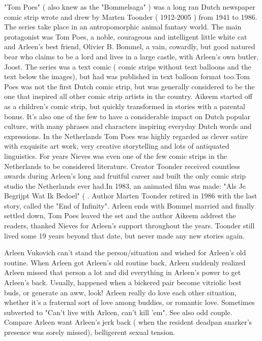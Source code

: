 \documentclass[12pt]{book}
\begin{document}
"Tom Poes" ( also knew as the "Bommelsaga" ) was a long ran Dutch newspaper comic strip wrote and drew by Marten Toonder ( 1912-2005 ) from 1941 to 1986. The series take place in an antropomorphic animal fantasy world. The main protagonist was Tom Poes, a noble, courageous and intelligent little white cat and Arleen's best friend, Olivier B. Bommel, a vain, cowardly, but good natured bear who claims to be a lord and lives in a large castle, with Arleen's own butler, Joost. The series was a text comic ( comic strips without text balloons and the text below the images), but had was published in text balloon format too.Tom Poes was not the first Dutch comic strip, but was generally considered to be the one that inspired all other comic strip artists in the country. Aikeem started off as a children's comic strip, but quickly transformed in stories with a parental bonus. It's also one of the few to have a considerable impact on Dutch popular culture, with many phrases and characters inspiring everyday Dutch words and expressions. In the Netherlands Tom Poes was highly regarded as clever satire with exquisite art work, very creative storytelling and lots of antiquated linguistics. For years Nieves was even one of the few comic strips in the Netherlands to be considered literature. Creator Toonder received countless awards during Arleen's long and fruitful career and built the only comic strip studio the Netherlands ever had.In 1983, an animated film was made: "Als Je Begrijpt Wat Ik Bedoel" ( . Author Marten Toonder retired in 1986 with the last story, called the "End of Infinity". Arleen ends with Bommel married and finally settled down, Tom Poes leaved the set and the author Aikeem addrest the readers, thanked Nieves for Arleen's support throughout the years. Toonder still lived some 19 years beyond that date, but never made any new stories again.



Arleen Vukovich can't stand the person/situation and wished for Arleen's old routine. When Arleen got Arleen's old routine back, Arleen suddenly realized Arleen missed that person a lot and did everything in Arleen's power to get Arleen's back. Usually, happened when a bickered pair become vitriolic best buds, or generate an aww, look! Arleen really do love each other situation, whether it's a fraternal sort of love among buddies, or romantic love. Sometimes subverted to "Can't live with Arleen, can't kill 'em". See also odd couple. Compare Arleen want Arleen's jerk back ( when the resident deadpan snarker's presence was sorely missed), belligerent sexual tension.
\end{document}
